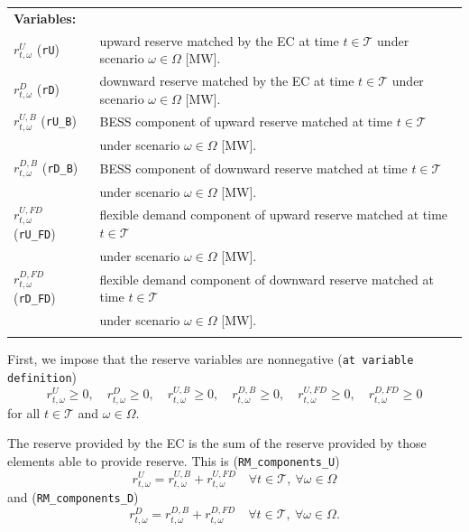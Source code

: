 \documentclass{article}
\begin{document}
\begin{tabularx}{\textwidth}{l l}
    \textbf{Variables:} \\
	$r^{U}_{t, \omega}$ (\verb|rU|) & upward reserve matched by the EC at time $t \in \mathcal{T}$ under scenario $\omega \in \Omega$ [MW]. \\
    $r^{D}_{t, \omega}$ (\verb|rD|) & downward reserve matched by the EC at time $t \in \mathcal{T}$ under scenario $\omega \in \Omega$ [MW]. \\
    $r^{U, B}_{t, \omega}$ (\verb|rU_B|) & BESS component of upward reserve matched at time $t \in \mathcal{T}$ \\
    & under scenario $\omega \in \Omega$ [MW]. \\
    $r^{D, B}_{t, \omega}$ (\verb|rD_B|) & BESS component of downward reserve matched at time $t \in \mathcal{T}$ \\
    & under scenario $\omega \in \Omega$ [MW]. \\
    $r^{U, FD}_{t, \omega}$ (\verb|rU_FD|) & flexible demand component of upward reserve matched at time $t \in \mathcal{T}$ \\
    & under scenario $\omega \in \Omega$ [MW]. \\
    $r^{D, FD}_{t, \omega}$ (\verb|rD_FD|) & flexible demand component of downward reserve matched at time $t \in \mathcal{T}$ \\
    & under scenario $\omega \in \Omega$ [MW]. \\
    \\
\end{tabularx}

First, we impose that the reserve variables are nonnegative (\verb|at variable definition|)
\begin{equation} \label{EQ:RVarDef}
    r^{U}_{t, \omega} \geq 0, \quad r^{D}_{t, \omega} \geq 0, \quad r^{U, B}_{t, \omega} \geq 0, \quad r^{D, B}_{t, \omega} \geq 0, \quad r^{U, FD}_{t, \omega} \geq 0, \quad r^{D, FD}_{t, \omega} \geq 0
\end{equation}
for all $t \in \mathcal{T}$ and $\omega \in \Omega$. 

The reserve provided by the EC is the sum of the reserve provided by those elements able to provide reserve. This is (\verb|RM_components_U|)
\begin{equation} \label{EQ:RUcomp}
    r^{U}_{t, \omega} = r^{U, B}_{t, \omega} +  r^{U, FD}_{t, \omega} \quad \forall t \in \mathcal{T}, \ \forall \omega \in \Omega
\end{equation}
and (\verb|RM_components_D|)
\begin{equation} \label{EQ:RDcomp}
	r^{D}_{t, \omega} = r^{D, B}_{t, \omega} +  r^{D, FD}_{t, \omega} \quad \forall t \in \mathcal{T}, \ \forall \omega \in \Omega.
\end{equation}
\end{document}
